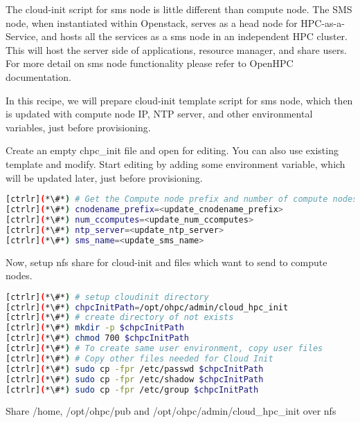 	The cloud-init script for sms node is little different than compute node. The SMS node, when instantiated within Openstack, serves as a head node for HPC-as-a-Service, and hosts all the services as a sms node in an independent HPC cluster. This will host the server side of applications, resource manager, and share users. For more detail on sms node functionality please refer to OpenHPC documentation.

	In this recipe, we will prepare cloud-init template script for sms node, which then is updated with compute node IP, NTP server, and other environmental variables, just before provisioning. 

	Create an empty chpc\_init file and open for editing. You can also use existing template and modify. Start editing by adding some environment variable, which will be updated later, just before provisioning.



\begin{lstlisting}[language=bash,keywords={}]
[ctrlr](*\#*) # Get the Compute node prefix and number of compute nodes
[ctrlr](*\#*) cnodename_prefix=<update_cnodename_prefix>
[ctrlr](*\#*) num_ccomputes=<update_num_ccomputes>
[ctrlr](*\#*) ntp_server=<update_ntp_server>
[ctrlr](*\#*) sms_name=<update_sms_name>
\end{lstlisting} 

	Now, setup nfs share for cloud-init and files which want to send to compute nodes.


\begin{lstlisting}[language=bash,keywords={}]
[ctrlr](*\#*) # setup cloudinit directory
[ctrlr](*\#*) chpcInitPath=/opt/ohpc/admin/cloud_hpc_init
[ctrlr](*\#*) # create directory of not exists
[ctrlr](*\#*) mkdir -p $chpcInitPath
[ctrlr](*\#*) chmod 700 $chpcInitPath
[ctrlr](*\#*) # To create same user environment, copy user files 
[ctrlr](*\#*) # Copy other files needed for Cloud Init
[ctrlr](*\#*) sudo cp -fpr /etc/passwd $chpcInitPath
[ctrlr](*\#*) sudo cp -fpr /etc/shadow $chpcInitPath
[ctrlr](*\#*) sudo cp -fpr /etc/group $chpcInitPath
\end{lstlisting} 

	Share /home, /opt/ohpc/pub and /opt/ohpc/admin/cloud\_hpc\_init over nfs

